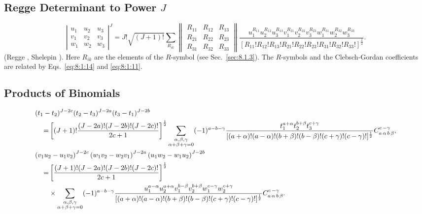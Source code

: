 \subsection{Regge Determinant to Power $J$}\label{sec:8.8.1}
\begin{equation}
\left|\begin{array}{ccc}
u_{1} & u_{2} & u_{3}  \\
v_{1} & v_{2} & v_{3} \\
w_{1} & w_{2} & w_{3}
\end{array}\right|^{J}=J!\sqrt{(J+1)!} \sum_{R_{i k}}\begin{Vmatrix}
R_{11} & R_{12} & R_{13} \\
R_{21} & R_{22} & R_{23} \\
R_{31} & R_{32} & R_{33}
\end{Vmatrix} \frac{u_{1}^{R_{11}} u_{2}^{R_{12}} u_{3}^{R_{13}} v_{1}^{R_{21}} v_{2}^{R_{22}} v_{3}^{R_{23}} w_{1}^{R_{31}} w_{2}^{R_{32}} w_{3}^{R_{33}}}{\left[R_{11}!R_{12}!R_{13}!R_{21}!R_{22}!R_{23}!R_{31}!R_{32}!R_{33}!\right]^{\frac{1}{2}}} . \label{eq:8:8:1}
\end{equation}
(Regge \cite{ref094}, Shelepin \cite{ref106}). Here $R_{i k}$ are the elements of the $R$-symbol (see Sec.~\ref{sec:8.1.3}). The $R$-symbols and the Clebsch-Gordan coefficients are related by Eqs.~\eqref{eq:8:1:14} and \eqref{eq:8:1:11}.

\subsection{Products of Binomials}\label{sec:8.8.2}
\begin{align}
\MoveEqLeft{(t_1-t_2)^{J-2c} (t_2-t_3)^{J-2a}(t_3-t_1)^{J-2b}}\notag\\
= & \left[(J+1)!\frac{(J-2 a)!(J-2 b)!(J-2 c)!}{2 c+1}\right]^{\frac{1}{2}} 
\sum_{\substack{\alpha, \beta, \gamma \\ \alpha+\beta+\gamma=0}}(-1)^{a-b-\gamma}   %
\frac{t_{1}^{a+\alpha} t_{2}^{b+\beta} t_{3}^{c+\gamma}}{[(a+\alpha)!(a-\alpha)!(b+\beta)!(b-\beta)!(c+\gamma)!(c-\gamma)!]^{\frac{1}{2}}} \clebsch{a}{\alpha}{b}{\beta}{c}{-\gamma}, \label{eq:8:8:2}\\
\MoveEqLeft{\left(v_{1} u_{2}-u_{1} v_{2}\right)^{J-2 c}\left(w_{1} v_{2}-w_{2} v_{1}\right)^{J-2 a}\left(u_{1} w_{2}-w_{1} u_{2}\right)^{J-2 b}} \notag \\
= & \left[\frac{(J+1)!(J-2 a)!(J-2 b)!(J-2 c)!}{2 c+1}\right]^{\frac{1}{2}}\notag\\& \times 
\sum_{\substack{\alpha, \beta, \gamma \\ \alpha+\beta+\gamma=0}}
(-1)^{a-b-\gamma} 
\frac{u_{1}^{a-\alpha} u_{2}^{a+\alpha} v_{1}^{b-\beta} v_{2}^{b+\beta} w_{1}^{c-\gamma} w_{2}^{c+\gamma}}{[(a+\alpha)!(a-\alpha)!(b+\beta)!(b-\beta)!(c+\gamma)!(c-\gamma)!]^{\frac{1}{2}}} \clebsch{a}{\alpha}{b}{\beta}{c}{-\gamma} . \label{eq:8:8:3}
\end{align}

